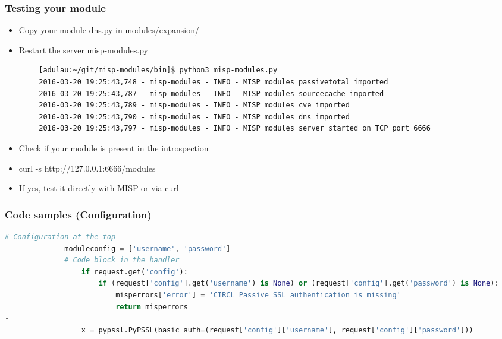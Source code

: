 \begin{frame}[t,fragile]
        \frametitle{Testing your module}
        \begin{itemize}
                \item Copy your module dns.py in modules/expansion/
                \item Restart the server misp-modules.py
        \end{itemize}
        \begin{adjustbox}{width=\textwidth,height=5cm,keepaspectratio}
        \begin{lstlisting}
        [adulau:~/git/misp-modules/bin]$ python3 misp-modules.py
        2016-03-20 19:25:43,748 - misp-modules - INFO - MISP modules passivetotal imported
        2016-03-20 19:25:43,787 - misp-modules - INFO - MISP modules sourcecache imported
        2016-03-20 19:25:43,789 - misp-modules - INFO - MISP modules cve imported
        2016-03-20 19:25:43,790 - misp-modules - INFO - MISP modules dns imported
        2016-03-20 19:25:43,797 - misp-modules - INFO - MISP modules server started on TCP port 6666
        \end{lstlisting}
        \end{adjustbox}
        \begin{itemize}
                \item Check if your module is present in the introspection
                \item curl -s http://127.0.0.1:6666/modules
                \item If yes, test it directly with MISP or via curl
        \end{itemize}
\end{frame}

\begin{frame}[fragile]
      \frametitle{Code samples (Configuration)}
      \begin{adjustbox}{width=\textwidth,height=5cm,keepaspectratio}
          \begin{lstlisting}[language=python]
              # Configuration at the top
              moduleconfig = ['username', 'password']
              # Code block in the handler
                  if request.get('config'):
                      if (request['config'].get('username') is None) or (request['config'].get('password') is None):
                          misperrors['error'] = 'CIRCL Passive SSL authentication is missing'
                          return misperrors
-
                  x = pypssl.PyPSSL(basic_auth=(request['config']['username'], request['config']['password']))

          \end{lstlisting}
        \end{adjustbox}
\end{frame}


